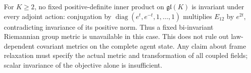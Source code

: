 For $K\geq2$, no fixed positive-definite inner product on $\mathfrak{gl}(K)$ is invariant under every adjoint action: conjugation by $\operatorname{diag}(e^t,e^{-t},1,\ldots,1)$ multiplies $E_{12}$ by $e^{2t}$, contradicting invariance of its positive norm. Thus a fixed bi-invariant Riemannian group metric is unavailable in this case. This does not rule out law-dependent covariant metrics on the complete agent state. Any claim about frame relaxation must specify the actual metric and transformation of all coupled fields; scalar invariance of the objective alone is insufficient.

